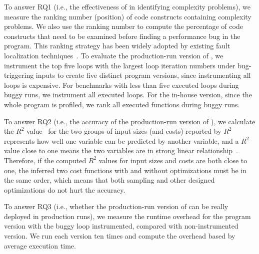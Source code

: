 To answer RQ1 (i.e., the effectiveness of  \Tool in identifying
complexity problems), we measure the ranking number (position) of code
constructs containing complexity problems. We also use the ranking number
to compute the percentage of code constructs
that need to be examined before finding a performance bug in the program.
This ranking strategy has been widely adopted by existing fault localization 
techniques~\cite{Jones05,Cleve05}.
To evaluate the production-run version of \Tool,
we instrument the top five loops with the largest loop 
iteration numbers under bug-triggering inputs to 
create five distinct program versions, 
since instrumenting all loops is expensive. 
For benchmarks with less than five executed 
loops during buggy runs, 
we instrument all executed loops.  
For the in-house version, since the whole program is profiled, 
we rank all executed functions during buggy runs. 


To answer RQ2 (i.e., the accuracy of the production-run version of \Tool),
we calculate the $R^2$ value~\cite{rsquare} 
for the two groups of input sizes (and costs) reported by 
$R^2$ represents how well one variable can be predicted by another variable,
and a $R^2$ value close to one means the two variables are 
in strong linear relationship~\cite{rsquare-value}.
Therefore, if the computed $R^2$ values for input sizes and costs
are both close to one,
the inferred two cost functions with and without optimizations must be in the same order, 
which means that both sampling and other designed optimizations 
do not hurt the accuracy. 

To answer RQ3 (i.e., whether the production-run version of \Tool 
can be really deployed in production runs), 
we measure the runtime overhead for the program version 
with the buggy loop instrumented, compared with non-instrumented version. 
We run each version ten times and compute the overhead based by average execution time. 



